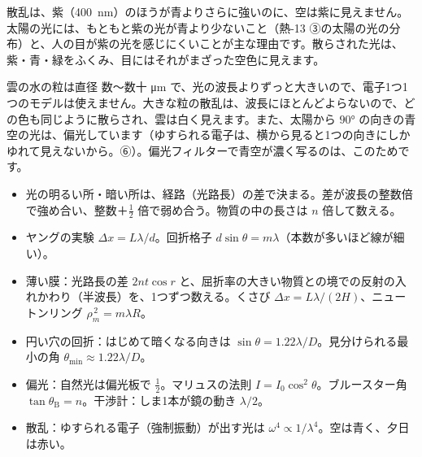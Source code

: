 \begin{phmijika}
散乱は、紫（\qty{400}{nm}）のほうが青よりさらに強いのに、空は紫に見えません。太陽の光には、もともと紫の光が青より少ないこと（熱-13 ③の太陽の光の分布）と、人の目が紫の光を感じにくいことが主な理由です。散らされた光は、紫・青・緑をふくみ、目にはそれがまざった空色に見えます。

雲の水の粒は直径 数〜数十 \unit{\micro m} で、光の波長よりずっと大きいので、電子1つ1つのモデルは使えません。大きな粒の散乱は、波長にほとんどよらないので、どの色も同じように散らされ、雲は白く見えます。また、太陽から $90°$ の向きの青空の光は、偏光しています（ゆすられる電子は、横から見ると1つの向きにしかゆれて見えないから。⑥）。偏光フィルターで青空が濃く写るのは、このためです。
\end{phmijika}

\begin{taisetsu}
\begin{itemize}[leftmargin=1.2\zw, itemsep=2pt, topsep=0pt, label={\color{bkNavy}●}]\raggedright
\item 光の明るい所・暗い所は、経路（光路長）の差で決まる。差が波長の整数倍で強め合い、整数＋$\tfrac12$ 倍で弱め合う。物質の中の長さは $n$ 倍して数える。
\item ヤングの実験 $\Delta x=L\lambda/d$。回折格子 $d\sin\theta=m\lambda$（本数が多いほど線が細い）。
\item 薄い膜：光路長の差 $2nt\cos r$ と、屈折率の大きい物質との境での反射の入れかわり（半波長）を、1つずつ数える。くさび $\Delta x=L\lambda/(2H)$、ニュートンリング $\rho_m^{\,2}=m\lambda R$。
\item 円い穴の回折：はじめて暗くなる向きは $\sin\theta=1.22\lambda/D$。見分けられる最小の角 $\theta_{\min}\approx1.22\lambda/D$。
\item 偏光：自然光は偏光板で $\tfrac12$。マリュスの法則 $I=I_0\cos^2\theta$。ブルースター角 $\tan\theta_{\mathrm B}=n$。干渉計：しま1本が鏡の動き $\lambda/2$。
\item 散乱：ゆすられる電子（強制振動）が出す光は $\omega^4\propto1/\lambda^4$。空は青く、夕日は赤い。
\end{itemize}
\end{taisetsu}

